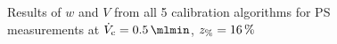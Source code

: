 \begin{figure}[!hb]
  \begin{center}
    \begin{subfigure}{\subFigSize}
    \end{subfigure}
    \begin{subfigure}{\subFigSize}
    \end{subfigure}
  \end{center}
  \vspace*{-4ex}    
  \caption[Results of $w$ and $V$ from all 5 calibration algorithms for PS measurements at
  $\Vc = \SI{0.5}{\mlmin}$, $\zP = \SI{16}{\percent}$]{
    Results of $w$ and $V$ from all 5 calibration algorithms for PS measurements at
    $\Vc = \SI{0.5}{\mlmin}$, $\zP = \SI{16}{\percent}$
  }
  \label{fig:calibRes_PS_VC0_5_tvoidCorr}
\end{figure}
